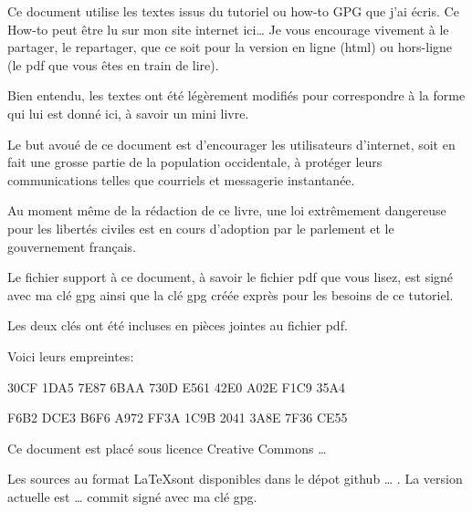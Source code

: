\documentclass[10pt,a4paper]{book}
\title{}
\author{Stéphane 22Decembre Guedon}
\date{13 mai 2015}
\begin{document}
	\maketitle

	\frontmatter
	
	Ce document utilise les textes issus du tutoriel ou how-to GPG que j'ai écris. Ce How-to peut être lu sur mon site internet ici… Je vous encourage vivement à le partager, le repartager, que ce soit pour la version en ligne (html) ou hors-ligne (le pdf que vous êtes en train de lire).
	
	Bien entendu, les textes ont été légèrement modifiés pour correspondre à la forme qui lui est donné ici, à savoir un mini livre.
	
	Le but avoué de ce document est d'encourager les utilisateurs d'internet, soit en fait une grosse partie de la population occidentale, à protéger leurs communications telles que courriels et messagerie instantanée.
	
	Au moment même de la rédaction de ce livre, une loi extrêmement dangereuse pour les libertés civiles est en cours d'adoption par le parlement et le gouvernement français.
	
	Le fichier support à ce document, à savoir le fichier pdf que vous lisez, est signé avec ma clé gpg ainsi que la clé gpg créée exprès pour les besoins de ce tutoriel.
	
	Les deux clés ont été incluses en pièces jointes au fichier pdf.
	
	Voici leurs empreintes:
	
		\begin{center}
			30CF 1DA5 7E87 6BAA 730D E561 42E0 A02E F1C9 35A4
		\end{center}
		
		\begin{center}
			F6B2 DCE3 B6F6 A972 FF3A 1C9B 2041 3A8E 7F36 CE55
		\end{center}
	
	Ce document est placé sous licence Creative Commons …
	
	Les sources au format \LaTeX sont disponibles dans le dépot github … . La version actuelle est … commit signé avec ma clé gpg.
	
	
	
	
	\mainmatter
	
	
		
	
	
	
	
\end{document}
